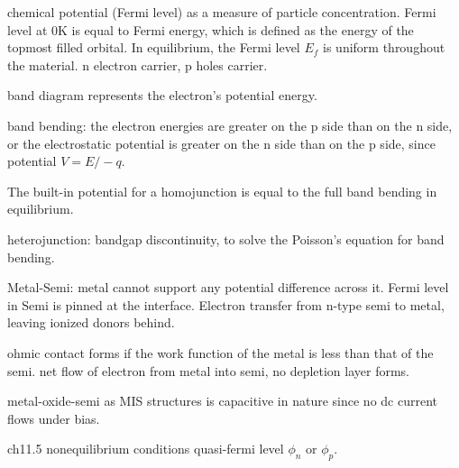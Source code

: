 chemical potential (Fermi level) as a measure of particle concentration.  Fermi level at 0K is equal to Fermi energy, which is defined as the energy of the topmost filled orbital. In equilibrium, the Fermi level $E_f$ is uniform throughout the material. n electron carrier, p holes carrier.

band diagram represents the electron's potential energy.

band bending: the electron energies are greater on the p side than on the n side, or the electrostatic potential is greater on the n side than on the p side, since potential $V = E/-q$.

The built-in potential for a homojunction is equal to the full band bending in equilibrium.

heterojunction: bandgap discontinuity, to solve the Poisson's equation for band bending.

Metal-Semi: metal cannot support any potential difference across it. Fermi level in Semi is pinned at the interface. Electron transfer from n-type semi to metal, leaving ionized donors behind.

ohmic contact forms if the work function of the metal is less than that of the semi. net flow of electron from metal into semi, no depletion layer forms.

metal-oxide-semi as MIS structures is capacitive in nature since no dc current flows under bias.

ch11.5 nonequilibrium conditions
quasi-fermi level $\phi_n$ or $\phi_p$.






























